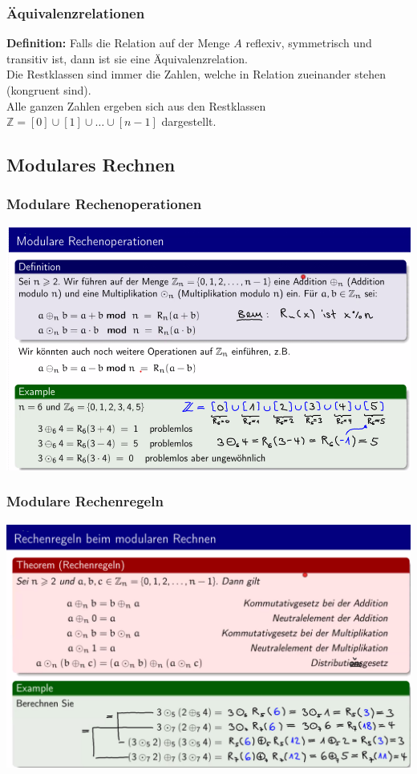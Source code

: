\documentclass[12pt]{scrartcl}
\begin{document}
\subsubsection{Äquivalenzrelationen}
\textbf{Definition:} Falls die Relation auf der Menge $A$ reflexiv, symmetrisch und transitiv ist, dann ist sie 
eine Äquivalenzrelation.\\

Die Restklassen sind immer die Zahlen, welche in Relation zueinander stehen (kongruent sind).\\

Alle ganzen Zahlen ergeben sich aus den Restklassen $\mathbb{Z} = [0] \cup [1] \cup \dots \cup [n-1]$ dargestellt.\\

\subsection{Modulares Rechnen}
\subsubsection{Modulare Rechenoperationen}
\includegraphics[width=14cm]{img/modulare_rechenoperationen.png}


\subsubsection{Modulare Rechenregeln}
\includegraphics[width=14cm]{img/modulare_rechenregeln.png}
\end{document}
